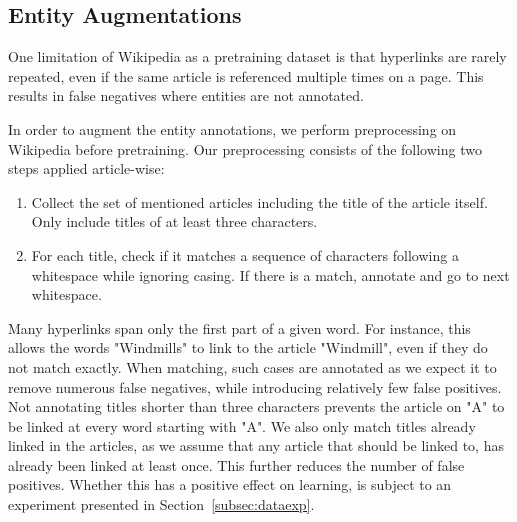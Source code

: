\documentclass[main.tex]{subfiles}
\begin{document}
\subsection{Entity Augmentations}
\label{subsec:entaug}
One limitation of Wikipedia as a pretraining dataset is that hyperlinks are rarely repeated, even if the same article is referenced multiple times on a page.
This results in false negatives where entities are not annotated.

In order to augment the entity annotations, we perform preprocessing on Wikipedia before pretraining.
Our preprocessing consists of the following two steps applied article-wise:
\begin{enumerate}
    \item Collect the set of mentioned articles including the title of the article itself.
    Only include titles of at least three characters.
    \item For each title, check if it matches a sequence of characters following a whitespace while ignoring casing.
    If there is a match, annotate and go to next whitespace.
\end{enumerate}
Many hyperlinks span only the first part of a given word.
For instance, this allows the words "Windmills" to link to the article "Windmill", even if they do not match exactly.
When matching, such cases are annotated as we expect it to remove numerous false negatives, while introducing relatively few false positives.
Not annotating titles shorter than three characters prevents the article on "A" to be linked at every word starting with "A".
We also only match titles already linked in the articles, as we assume that any article that should be linked to, has already been linked at least once.
This further reduces the number of false positives.
Whether this has a positive effect on learning, is subject to an experiment presented in Section~\ref{subsec:dataexp}.
\end{document}
